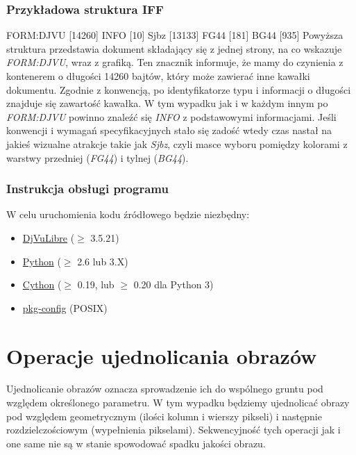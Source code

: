 \documentclass[a4paper,12pt]{book}
\begin{document}
\subsection{Przykładowa struktura IFF}
FORM:DJVU [14260] \newline
\tabto{5mm} INFO [10] \newline
\tabto{5mm} Sjbz [13133] \newline
\tabto{5mm} FG44 [181] \newline
\tabto{5mm} BG44 [935] \newline
\newline
Powyższa struktura przedstawia dokument składający się z jednej strony, na co wskazuje \textit{FORM:DJVU}, wraz z grafiką. Ten znacznik informuje, że mamy do czynienia z kontenerem o długości 14260 bajtów, który może zawierać inne kawałki dokumentu. Zgodnie z konwencją, po identyfikatorze typu i informacji o długości znajduje się zawartość kawałka. W tym wypadku jak i w każdym innym po \textit{FORM:DJVU} powinno znaleźć się \textit{INFO} z podstawowymi informacjami. Jeśli konwencji i wymagań specyfikacyjnych stało się zadość wtedy czas nastał na jakieś wizualne atrakcje takie jak \textit{Sjbz}, czyli masce wyboru pomiędzy kolorami z warstwy przedniej (\textit{FG44}) i tylnej (\textit{BG44}). 
\subsection{Instrukcja obsługi programu}
W celu uruchomienia kodu źródłowego będzie niezbędny: 
\begin{itemize}
	\item \href{http://djvu.sourceforge.net/}{DjVuLibre} ($\geq$ 3.5.21)
	\item \href{https://www.python.org/}{Python} ($\geq$ 2.6 lub 3.X)
	\item \href{https://cython.org/}{Cython} ($\geq$ 0.19, lub $\geq$ 0.20 dla Python 3)
	\item \href{https://wiki.freedesktop.org/www/Software/pkg-config/}{pkg-config} (POSIX)
\end{itemize}

\chapter{Operacje ujednolicania obrazów}
Ujednolicanie obrazów oznacza sprowadzenie ich do wspólnego gruntu pod względem określonego parametru. W tym wypadku będziemy ujednolicać obrazy pod względem geometrycznym (ilości kolumn i wierszy pikseli) i następnie rozdzielczościowym (wypełnienia pikselami). Sekwencyjność tych operacji jak i one same nie są w stanie spowodować spadku jakości obrazu. 
\end{document}
